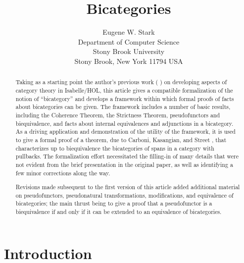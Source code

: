 \documentclass[11pt,notitlepage,a4paper]{report}
\begin{document}
\title{Bicategories}
\author{Eugene W. Stark\\[\medskipamount]
        Department of Computer Science\\
        Stony Brook University\\
        Stony Brook, New York 11794 USA}
\maketitle

\begin{abstract}
Taking as a starting point the author's previous work
(\cite{Category3-AFP} \cite{MonoidalCategory-AFP})
on developing aspects of category theory in Isabelle/HOL, this article gives a
compatible formalization of the notion of ``bicategory'' and develops a
framework within which formal proofs of facts about bicategories can be given.
The framework includes a number of basic results, including the
Coherence Theorem, the Strictness Theorem, pseudofunctors and biequivalence,
and facts about internal equivalences and adjunctions in a bicategory.
As a driving application and demonstration of the utility of the framework,
it is used to give a formal proof of a theorem, due to Carboni, Kasangian,
and Street \cite{carboni-et-al}, that characterizes up to biequivalence
the bicategories of spans in a category with pullbacks.
The formalization effort necessitated the filling-in of many details
that were not evident from the brief presentation in the original paper,
as well as identifying a few minor corrections along the way.

Revisions made subsequent to the first version of this article added additional
material on pseudofunctors, pseudonatural transformations, modifications, and equivalence
of bicategories; the main thrust being to give a proof that a pseudofunctor is
a biequivalence if and only if it can be extended to an equivalence of bicategories.
\end{abstract}

\tableofcontents

{}
\chapter*{Introduction}
\end{document}
